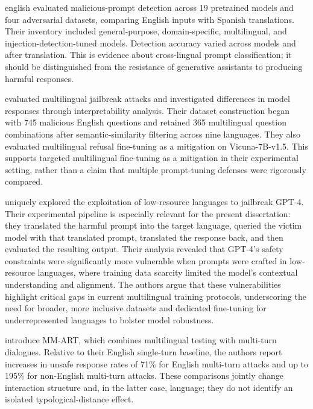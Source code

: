 \begin{otherlanguage*}{english}
\textcite{abbasiMultilingualPromptInjection2025} evaluated malicious-prompt detection across 19 pretrained models and four adversarial datasets, comparing English inputs with Spanish translations. Their inventory included general-purpose, domain-specific, multilingual, and injection-detection-tuned models. Detection accuracy varied across models and after translation. This is evidence about cross-lingual prompt classification; it should be distinguished from the resistance of generative assistants to producing harmful responses.

\textcite{liCrossLanguageInvestigationJailbreak2024} evaluated multilingual jailbreak attacks and investigated differences in model responses through interpretability analysis. Their dataset construction began with 745 malicious English questions and retained 365 multilingual question combinations after semantic-similarity filtering across nine languages. They also evaluated multilingual refusal fine-tuning as a mitigation on Vicuna-7B-v1.5. This supports targeted multilingual fine-tuning as a mitigation in their experimental setting, rather than a claim that multiple prompt-tuning defenses were rigorously compared.

\textcite{yongLowResourceLanguagesJailbreak2023} uniquely explored the exploitation of low-resource languages to jailbreak GPT-4. Their experimental pipeline is especially relevant for the present dissertation: they translated the harmful prompt into the target language, queried the victim model with that translated prompt, translated the response back, and then evaluated the resulting output. Their analysis revealed that GPT-4's safety constraints were significantly more vulnerable when prompts were crafted in low-resource languages, where training data scarcity limited the model's contextual understanding and alignment. The authors argue that these vulnerabilities highlight critical gaps in current multilingual training protocols, underscoring the need for broader, more inclusive datasets and dedicated fine-tuning for underrepresented languages to bolster model robustness.

\textcite{singhaniaMultilingualMultiturnAutomated2025} introduce MM-ART, which combines multilingual testing with multi-turn dialogues. Relative to their English single-turn baseline, the authors report increases in unsafe response rates of 71\% for English multi-turn attacks and up to 195\% for non-English multi-turn attacks. These comparisons jointly change interaction structure and, in the latter case, language; they do not identify an isolated typological-distance effect.


\end{otherlanguage*}
